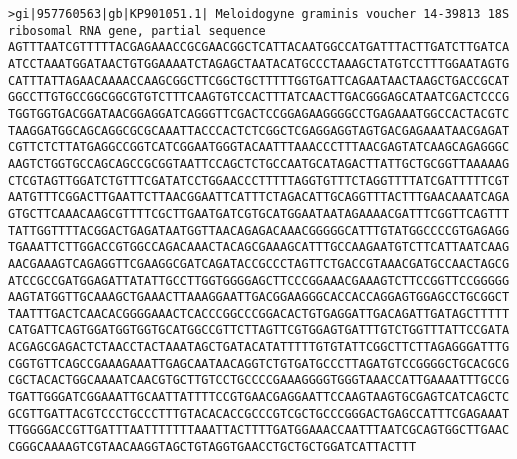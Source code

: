 \documentclass[11pt]{article}
\begin{document}
\begin{Verbatim}[commandchars=\\\{\}]
>gi|957760563|gb|KP901051.1| Meloidogyne graminis voucher 14-39813 18S ribosomal RNA gene, partial sequence
AGTTTAATCGTTTTTACGAGAAACCGCGAACGGCTCATTACAATGGCCATGATTTACTTGATCTTGATCA
ATCCTAAATGGATAACTGTGGAAAATCTAGAGCTAATACATGCCCTAAAGCTATGTCCTTTGGAATAGTG
CATTTATTAGAACAAAACCAAGCGGCTTCGGCTGCTTTTTGGTGATTCAGAATAACTAAGCTGACCGCAT
GGCCTTGTGCCGGCGGCGTGTCTTTCAAGTGTCCACTTTATCAACTTGACGGGAGCATAATCGACTCCCG
TGGTGGTGACGGATAACGGAGGATCAGGGTTCGACTCCGGAGAAGGGGCCTGAGAAATGGCCACTACGTC
TAAGGATGGCAGCAGGCGCGCAAATTACCCACTCTCGGCTCGAGGAGGTAGTGACGAGAAATAACGAGAT
CGTTCTCTTATGAGGCCGGTCATCGGAATGGGTACAATTTAAACCCTTTAACGAGTATCAAGCAGAGGGC
AAGTCTGGTGCCAGCAGCCGCGGTAATTCCAGCTCTGCCAATGCATAGACTTATTGCTGCGGTTAAAAAG
CTCGTAGTTGGATCTGTTTCGATATCCTGGAACCCTTTTTAGGTGTTTCTAGGTTTTATCGATTTTTCGT
AATGTTTCGGACTTGAATTCTTAACGGAATTCATTTCTAGACATTGCAGGTTTACTTTGAACAAATCAGA
GTGCTTCAAACAAGCGTTTTCGCTTGAATGATCGTGCATGGAATAATAGAAAACGATTTCGGTTCAGTTT
TATTGGTTTTACGGACTGAGATAATGGTTAACAGAGACAAACGGGGGCATTTGTATGGCCCCGTGAGAGG
TGAAATTCTTGGACCGTGGCCAGACAAACTACAGCGAAAGCATTTGCCAAGAATGTCTTCATTAATCAAG
AACGAAAGTCAGAGGTTCGAAGGCGATCAGATACCGCCCTAGTTCTGACCGTAAACGATGCCAACTAGCG
ATCCGCCGATGGAGATTATATTGCCTTGGTGGGGAGCTTCCCGGAAACGAAAGTCTTCCGGTTCCGGGGG
AAGTATGGTTGCAAAGCTGAAACTTAAAGGAATTGACGGAAGGGCACCACCAGGAGTGGAGCCTGCGGCT
TAATTTGACTCAACACGGGGAAACTCACCCGGCCCGGACACTGTGAGGATTGACAGATTGATAGCTTTTT
CATGATTCAGTGGATGGTGGTGCATGGCCGTTCTTAGTTCGTGGAGTGATTTGTCTGGTTTATTCCGATA
ACGAGCGAGACTCTAACCTACTAAATAGCTGATACATATTTTTGTGTATTCGGCTTCTTAGAGGGATTTG
CGGTGTTCAGCCGAAAGAAATTGAGCAATAACAGGTCTGTGATGCCCTTAGATGTCCGGGGCTGCACGCG
CGCTACACTGGCAAAATCAACGTGCTTGTCCTGCCCCGAAAGGGGTGGGTAAACCATTGAAAATTTGCCG
TGATTGGGATCGGAAATTGCAATTATTTTCCGTGAACGAGGAATTCCAAGTAAGTGCGAGTCATCAGCTC
GCGTTGATTACGTCCCTGCCCTTTGTACACACCGCCCGTCGCTGCCCGGGACTGAGCCATTTCGAGAAAT
TTGGGGACCGTTGATTTAATTTTTTTAAATTACTTTTGATGGAAACCAATTTAATCGCAGTGGCTTGAAC
CGGGCAAAAGTCGTAACAAGGTAGCTGTAGGTGAACCTGCTGCTGGATCATTACTTT


\end{Verbatim}
\end{document}
